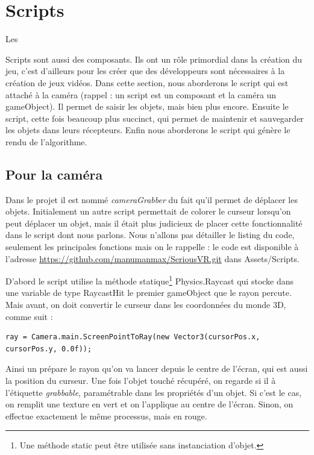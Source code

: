 \documentclass[a4paper,11pt]{myreport}
\begin{document}
	\section{Scripts}
	\hypertarget{scriptTarget}{Les} Scripts sont aussi des composants. Ils ont un rôle primordial dans la création du jeu, c'est d'ailleurs pour les créer que des développeurs sont nécessaires à la création de jeux vidéos.
	Dans cette section, nous aborderons le script qui est attaché à la caméra (rappel : un script est un composant et la caméra un gameObject). Il permet de saisir les objets, mais bien plus encore. Ensuite le script, cette fois beaucoup plus succinct, qui permet de maintenir et sauvegarder les objets dans leurs récepteurs. Enfin nous aborderons le script qui génère le rendu de l'algorithme.
	\subsection{Pour la caméra}
	Dans le projet il est nommé \textit{cameraGrabber} du fait qu'il permet de déplacer les objets. Initialement un autre script permettait de colorer le curseur lorsqu'on peut déplacer un objet, mais il était plus judicieux de placer cette fonctionnalité   dans le script dont nous parlons. Nous n'allons pas détailler le listing du code, seulement les principales fonctions mais on le rappelle : le code est disponible à l'adresse \href{https://github.com/manumanmax/SeriousVR.git}{https://github.com/manumanmax/SeriousVR.git} dans Assets/Scripts.
	
	\par D'abord le script utilise la méthode statique\footnote{Une méthode static peut être utilisée sans instanciation d'objet.} Physics.Raycast qui stocke dans une variable de type RaycastHit le premier gameObject que le rayon percute. Mais avant, on doit convertir le curseur dans les coordonnées du monde 3D, comme suit : 
	
	\lstset{style=sharpc}
\begin{lstlisting}
ray = Camera.main.ScreenPointToRay(new Vector3(cursorPos.x, cursorPos.y, 0.0f));
\end{lstlisting}
	Ainsi un prépare le rayon qu'on va lancer depuis le centre de l'écran, qui est aussi la position du curseur. Une fois l'objet touché récupéré, on regarde si il à l'étiquette \textit{grabbable}, paramétrable dans les propriétés d'un objet.
	Si c'est le cas, on remplit une texture en vert et on l'applique au centre de l'écran. Sinon, on effectue exactement le même processus, mais en rouge.
	
\end{document}
